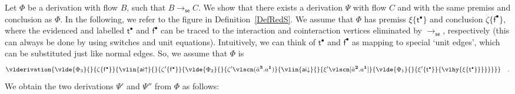 \documentclass[a4paper]{LMCS}
\begin{document}
\proof
Let $\Phi$ be a derivation with flow $B$, such that $B\to_{{\mathsf{se}}} C$. We show that there exists a derivation $\Psi$ with flow $C$ and with the same premiss and conclusion as $\Phi$. In the following, we refer to the figure in Definition~\ref{DefRedS}. We assume that $\Phi$ has premiss $\xi\{{{{\mathsf t}}^{\scriptscriptstyle\bullet}}\}$ and conclusion $\zeta\{{{{\mathsf f}}^{\scriptscriptstyle\bullet}}\}$, where the evidenced and labelled ${{{\mathsf t}}^{\scriptscriptstyle\bullet}}$ and ${{{\mathsf f}}^{\scriptscriptstyle\bullet}}$ can be traced to the interaction and cointeraction vertices eliminated by $\to_{{\mathsf{se}}}$, respectively (this can always be done by using switches and unit equations). Intuitively, we can think of ${{{\mathsf t}}^{\scriptscriptstyle\bullet}}$ and ${{{\mathsf f}}^{\scriptscriptstyle\bullet}}$ as mapping to special `unit edges', which can be substituted just like normal edges. So, we assume that $\Phi$ is
\[
\vlderivation                                           {
\vlde{\Phi_3}{}{\zeta\{{{{\mathsf f}}^{\scriptscriptstyle\bullet}}\}                 }    {
\vlin{{{\mathsf{ai}}{\uparrow}}}{}{\zeta'\{{{{\mathsf f}}^{\scriptscriptstyle\bullet}}\}                }   {
\vlde{\Phi_2}{}{\zeta'\vlscn(\bar a^{{\mathchoice{\scriptstyle\mathbf3}
                                {\scriptstyle\mathbf3}
                                {\scriptstyle\mathbf3}
                                {\scriptscriptstyle\mathbf3}}}.a^{{\mathchoice{\scriptstyle\mathbf1}
                              {\scriptstyle\mathbf1}
                              {\scriptstyle\mathbf1}
                              {\scriptscriptstyle\mathbf1}}})}  {
\vlin{{{\mathsf{ai}}{\downarrow}}}{}{\xi'\vlscn[\bar a^{{\mathchoice{\scriptstyle\mathbf2}
                              {\scriptstyle\mathbf2}
                              {\scriptstyle\mathbf2}
                              {\scriptscriptstyle\mathbf2}}}.a^{{\mathchoice{\scriptstyle\mathbf1}
                              {\scriptstyle\mathbf1}
                              {\scriptstyle\mathbf1}
                              {\scriptscriptstyle\mathbf1}}}]    } {
\vlde{\Phi_1}{}{\xi'\{{{{\mathsf t}}^{\scriptscriptstyle\bullet}}\}                  }{
\vlhy          {\xi\{{{{\mathsf t}}^{\scriptscriptstyle\bullet}}\}                   }}}}}}}
\quad.
\]
We obtain the two derivations $\Psi'$ and $\Psi''$ from $\Phi$ as follows:
\end{document}
